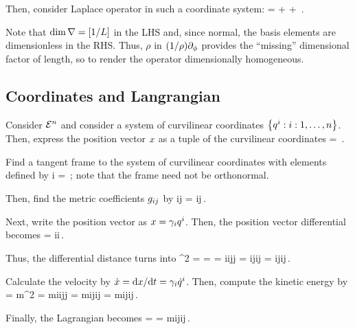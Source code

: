Then, consider Laplace operator in such a coordinate system:
\beq
\gder = \xpd{}{\rho}\nvec\rho + \xpd{}{\phi}\nvec\phi + \,.
\eeq

Note that $\dim\nabla = \left[{1/L}\right]$ in the LHS and, since normal, the basis elements are dimensionless in the RHS. Thus, $\rho$ in $(1/\rho)\partial_{\phi}$ provides the ``missing'' dimensional factor of length, so to render the operator dimensionally homogeneous.


\subsection{Coordinates and Langrangian}
Consider $\mathcal{E}^{n}$ and consider a system of curvilinear coordinates $\left\lbrace{{{q}^{i}}:{i: 1,\dotsc,n}}\right\rbrace$. Then, express the position vector $x$ as a tuple of the curvilinear coordinates
\beq
\pvec = \,.
\eeq

Find a tangent frame to the system of curvilinear coordinates with elements defined by
\beq
\ifvec i = \xpd{}\,;
\eeq
note that the frame need not be orthonormal.

Then, find the metric coefficients $g_{{i}{j}}$ by
\beq
\imet ij = \ifvec i\iprod\ifvec j\,.
\eeq

Next, write the position vector as $x = \gamma_{i}{q}^{i}$. Then, the position vector differential becomes
\beq
\dx\pvec = \ifvec i\dx\gpos i\,.
\eeq

Thus, the differential distance turns into
\beq
\dx\svec^2 = \dx\pvec\dx\pvec
           = \dx\pvec\iprod\dx\pvec
           = \ifvec i\gpos i\iprod\ifvec j\gpos j
           = \ifvec i\iprod\ifvec j\gpos i\gpos j
           = \imet ij\gpos i\gpos j\,.
\eeq

Calculate the velocity by $\dot{x} = \text{d}x/\text{d} t = \gamma_{i}{\dot{q}}^{i}$. Then, compute the kinetic energy by 
\beq
\ken = m\dt\pvec^2
     = m\ifvec i\gvel i\iprod\ifvec j\gvel j
     = m\ifvec i\iprod\ifvec j\gvel i\gvel j
     = m\imet ij\gvel i\gvel j\,.
\eeq

Finally, the Lagrangian becomes
\beq
\lag = \ken 
     = m\imet ij\gvel i\gvel j\,.
\eeq

